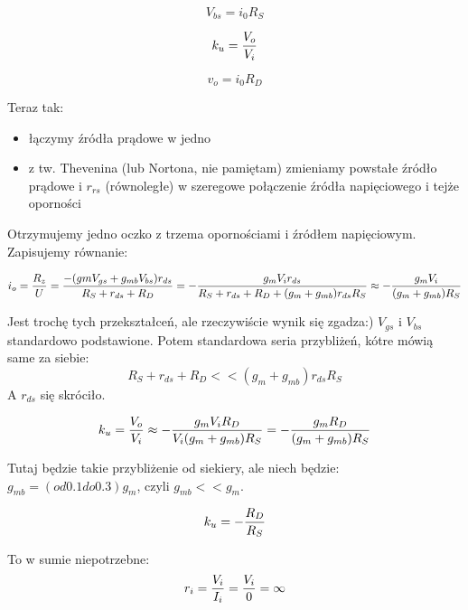 \documentclass[10pt,a4paper]{article}
\begin{document}
\begin{equation}
V_{bs} = i_0R_S
\end{equation}

\begin{equation}
k_u = {V_o \over V_i}
\end{equation}

\begin{equation}
v_o = i_0R_D
\end{equation}

Teraz tak:
\begin{itemize}
\item łączymy źródła prądowe w jedno
\item z tw. Thevenina (lub Nortona, nie pamiętam) zmieniamy powstałe źródło prądowe i $r_{rs}$ (równoległe) w szeregowe połączenie źródła napięciowego i tejże oporności
\end{itemize}
Otrzymujemy jedno oczko z trzema opornościami i źródłem napięciowym. Zapisujemy równanie:

\begin{equation}
i_o = {R_z \over U} = { -(gmV_{gs} + g_{mb}V_{bs})r_{ds} \over R_S + r_{ds} + R_D} = -{g_mV_ir_{ds} \over R_S + r_{ds} + R_D + (g_m+g_{mb})r_{ds}R_S} \approx -{g_mV_i \over  (g_m+g_{mb})R_S} 
\end{equation}

Jest trochę tych przekształceń, ale rzeczywiście wynik się zgadza:) $V_{gs}$ i $V_{bs}$ standardowo podstawione. Potem standardowa seria przybliżeń, kótre mówią same za siebie: 
\begin{equation}
 R_S + r_{ds} + R_D << (g_m+g_{mb})r_{ds}R_S
\end{equation}
A $r_{ds}$ się skróciło.

\begin{equation}
k_u = {V_o \over V_i} \approx -{g_mV_iR_D \over  V_i(g_m+g_{mb})R_S} = -{g_mR_D \over  (g_m+g_{mb})R_S}
\end{equation}

Tutaj będzie takie przybliżenie od siekiery, ale niech będzie: $g_{mb} = (od 0.1 do 0.3) g_m$, czyli $g_{mb} << g_m$.

\begin{equation}
k_u =-{ R_D \over R_S}
\end{equation}

To w sumie niepotrzebne:
\begin{equation}
r_i = {V_i \over I_i} = {V_i \over 0} = \infty
\end{equation}
\end{document}

